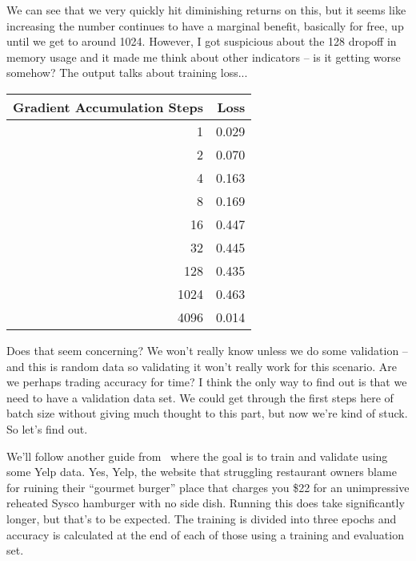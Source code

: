 We can see that we very quickly hit diminishing returns on this, but it seems like increasing the number continues to have a marginal benefit, basically for free, up until we get to around 1024. However, I got suspicious about the 128 dropoff in memory usage and it made me think about other indicators -- is it getting worse somehow? The output talks about training loss...

\begin{center}
\begin{tabular}{r|r}
\textbf{Gradient Accumulation Steps} & \textbf{Loss} \\ \hline
1 & 0.029 \\
2 & 0.070 \\
4 & 0.163 \\
8 & 0.169 \\
16 & 0.447 \\
32 & 0.445 \\
128 & 0.435 \\
1024 & 0.463 \\
4096 & 0.014 \\
\end{tabular}
\end{center}

Does that seem concerning? We won't really know unless we do some validation -- and this is random data so validating it won't really work for this scenario. Are we perhaps trading accuracy for time? I think the only way to find out is that we need to have a validation data set. We could get through the first steps here of batch size without giving much thought to this part, but now we're kind of stuck. So let's find out.

We'll follow another guide from~\cite{hf3} where the goal is to train and validate using some Yelp data. Yes, Yelp, the website that struggling restaurant owners blame for ruining their ``gourmet burger'' place that charges you \$22 for an unimpressive reheated Sysco hamburger with no side dish. Running this does take significantly longer, but that's to be expected. The training is divided into three epochs and accuracy is calculated at the end of each of those using a training and evaluation set.

